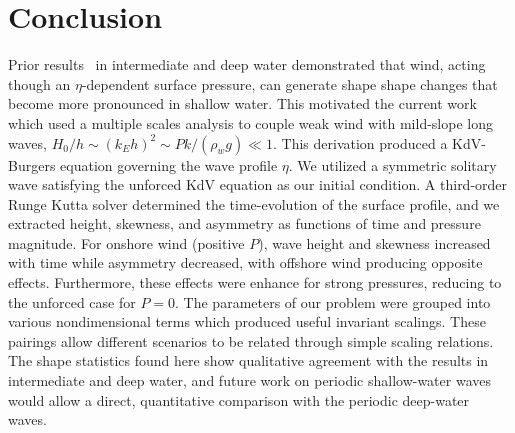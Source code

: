 \documentclass{jfm}
\begin{document}
\section{Conclusion}
Prior results~\citep{zdyrski2019wind} in intermediate and deep water
demonstrated that wind, acting though an $\eta$-dependent surface
pressure, can generate shape shape changes that become more pronounced
in shallow water.
This motivated the current work which used a multiple scales analysis to
couple weak wind with mild-slope long waves, \ie $H_0/h \sim (k_E h)^2
\sim P k/(\rho_w g) \ll 1$.
This derivation produced a KdV-Burgers equation governing the wave
profile $\eta$.
We utilized a symmetric solitary wave satisfying the unforced KdV
equation as our initial condition.
A third-order Runge Kutta solver determined the time-evolution of the
surface profile, and we extracted height, skewness, and asymmetry as
functions of time and pressure magnitude.
For onshore wind (positive $P$), wave height and skewness increased with
time while asymmetry decreased, with offshore wind producing opposite
effects.
Furthermore, these effects were enhance for strong pressures, reducing
to the unforced case for $P=0$.
The parameters of our problem were grouped into various nondimensional
terms which produced useful invariant scalings.
These pairings allow different scenarios to be related through simple
scaling relations.
The shape statistics found here show qualitative agreement with the
results in intermediate and deep water, and future work on periodic
shallow-water waves would allow a direct, quantitative comparison with
the periodic deep-water waves.

\appendix
\end{document}
